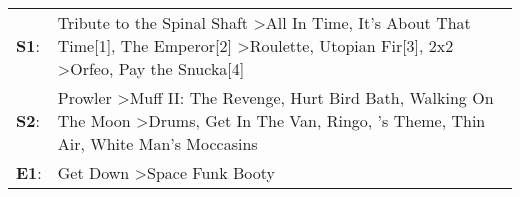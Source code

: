 \begin{supertabular}{p{0.03\textwidth}p{0.92\textwidth}}
 \textbf{S1}:  &                    Tribute to the Spinal Shaft\textsuperscript{} \textgreater \enspace All In Time\textsuperscript{}, \enspace It's About That Time[1]\textsuperscript{}, \enspace The Emperor[2]\textsuperscript{} \textgreater \enspace Roulette\textsuperscript{}, \enspace Utopian Fir[3]\textsuperscript{}, \enspace 2x2\textsuperscript{} \textgreater \enspace Orfeo\textsuperscript{}, \enspace Pay the Snucka[4]\textsuperscript{}  \enspace  \\
 \textbf{S2}:  &  Prowler\textsuperscript{} \textgreater \enspace Muff II: The Revenge\textsuperscript{}, \enspace Hurt Bird Bath\textsuperscript{}, \enspace Walking On The Moon\textsuperscript{} \textgreater \enspace Drums\textsuperscript{}, \enspace Get In The Van\textsuperscript{}, \enspace Ringo\textsuperscript{}, 's Theme\textsuperscript{}, \enspace Thin Air\textsuperscript{}, \enspace White Man's Moccasins\textsuperscript{}  \enspace  \\
 \textbf{E1}:  &                                                                                                                                                                                                                                                                                                                                                         Get Down\textsuperscript{} \textgreater \enspace Space Funk Booty\textsuperscript{}  \enspace  \\
\end{supertabular}
